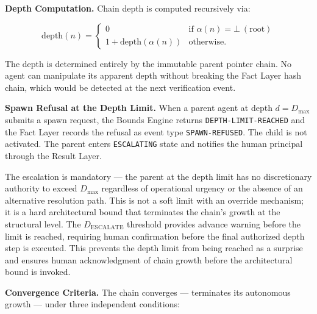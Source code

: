 \medskip
\noindent\textbf{Depth Computation.} Chain depth is computed recursively via:

\begin{equation}
\mathrm{depth}(n) =
\begin{cases}
0 & \text{if }\alpha(n) = \bot\ (\text{root}) \\[6pt]
1 + \mathrm{depth}(\alpha(n)) & \text{otherwise}.
\end{cases}
\label{eq:rs-depth}
\end{equation}

The depth is determined entirely by the immutable parent pointer chain. No agent can manipulate its apparent depth without breaking the Fact Layer hash chain, which would be detected at the next verification event.

\medskip
\noindent\textbf{Spawn Refusal at the Depth Limit.} When a parent agent at depth $d = D_{\max}$ submits a spawn request, the Bounds Engine returns \texttt{DEPTH-LIMIT-REACHED} and the Fact Layer records the refusal as event type \texttt{SPAWN-REFUSED}. The child is not activated. The parent enters \texttt{ESCALATING} state and notifies the human principal through the Result Layer.

The escalation is mandatory — the parent at the depth limit has no discretionary authority to exceed $D_{\max}$ regardless of operational urgency or the absence of an alternative resolution path. This is not a soft limit with an override mechanism; it is a hard architectural bound that terminates the chain's growth at the structural level. The $D_{\text{ESCALATE}}$ threshold provides advance warning before the limit is reached, requiring human confirmation before the final authorized depth step is executed. This prevents the depth limit from being reached as a surprise and ensures human acknowledgment of chain growth before the architectural bound is invoked.

\medskip
\noindent\textbf{Convergence Criteria.} The chain converges — terminates its autonomous growth — under three independent conditions:

